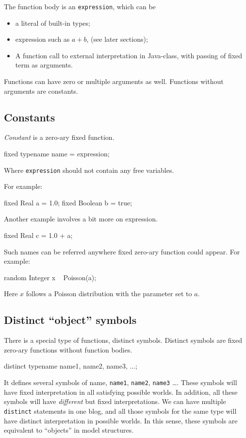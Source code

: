 \documentclass[12pt]{article}
\begin{document}
The function body is an \texttt{expression}, which can be
\begin{itemize}
\item a literal of built-in types;
\item expression such as $a+b$, (see later sections);
\item A function call to external interpretation in Java-class, with passing of fixed term as arguments. 
\end{itemize}

Functions can have zero or multiple arguments as well. Functions without arguments are constants. 

\subsection{Constants}
{\em Constant} is a zero-ary fixed function.
\begin{blogcode}
fixed typename name = expression;
\end{blogcode} 
Where \texttt{expression} should not contain any free variables. 

For example:
\begin{blogcode}
fixed Real a = 1.0;
fixed Boolean b = true;
\end{blogcode}

Another example involves a bit more on expression.
\begin{blogcode}
fixed Real c = 1.0 + a;
\end{blogcode}

Such names can be referred anywhere fixed zero-ary function could appear.
For example:
\begin{blogcode}
random Integer x ~ Poisson(a);
\end{blogcode}
Here $x$ follows a Poisson distribution with the parameter set to $a$.

\subsection{Distinct ``object'' symbols}
There is a special type of functions, distinct symbols. 
Distinct symbols are fixed zero-ary functions without function bodies.
\begin{blogcode}
distinct typename name1, name2, name3, ...;
\end{blogcode}
It defines several symbols of name, \texttt{name1}, \texttt{name2}, \texttt{name3} \dots.
These symbols will have fixed interpretation in all satisfying possible worlds. In addition, all these symbols will have \emph{different} but fixed interpretations. 
We can have multiple \texttt{distinct} statements in one blog, and all those symbols for the same type will have 
distinct interpretation in possible worlds. In this sense, these symbols are equivalent to ``objects'' in model structures. 
\end{document}
